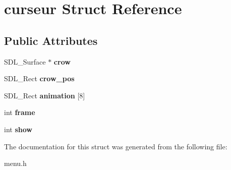 \hypertarget{structcurseur}{}\section{curseur Struct Reference}
\label{structcurseur}
\subsection*{Public Attributes}
\begin{DoxyCompactItemize}
\item 
S\+D\+L\+\_\+\+Surface $\ast$ {\bfseries crow}\hypertarget{structcurseur_a5b3a4fd0c1d1952f718c33362d7aa38a}{}\label{structcurseur_a5b3a4fd0c1d1952f718c33362d7aa38a}

\item 
S\+D\+L\+\_\+\+Rect {\bfseries crow\+\_\+pos}\hypertarget{structcurseur_a407527e869d7957f83be0dfc35cc7aa6}{}\label{structcurseur_a407527e869d7957f83be0dfc35cc7aa6}

\item 
S\+D\+L\+\_\+\+Rect {\bfseries animation} \mbox{[}8\mbox{]}\hypertarget{structcurseur_a2a6eeac3c9dc986265ac937651707812}{}\label{structcurseur_a2a6eeac3c9dc986265ac937651707812}

\item 
int {\bfseries frame}\hypertarget{structcurseur_afb241358e91b1be4b79f14cd803c5638}{}\label{structcurseur_afb241358e91b1be4b79f14cd803c5638}

\item 
int {\bfseries show}\hypertarget{structcurseur_a97bcdc8b7e64de3e4d41bb1e2d83a7ac}{}\label{structcurseur_a97bcdc8b7e64de3e4d41bb1e2d83a7ac}

\end{DoxyCompactItemize}


The documentation for this struct was generated from the following file\+:\begin{DoxyCompactItemize}
\item 
menu.\+h\end{DoxyCompactItemize}
